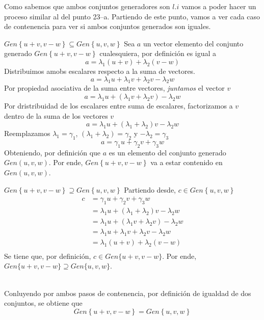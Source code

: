 \documentclass{article}
\begin{document}
\begin{enumerate}
                
        Como sabemos que ambos conjuntos generadores son \(l.i\) vamos a poder hacer un proceso similar al del punto 23--a.
        Partiendo de este punto, vamos a ver cada caso de contenencia para ver si ambos conjuntos generados son iguales.
        \ResetCases{}
        \begin{mathcase}{\(Gen\left\{u + v, v - w\right\} \subseteq Gen\left\{u, v, w\right\}\)}
            Sea \(a\) un vector elemento del conjunto generado \(Gen\left\{u + v, v - w\right\}\) cualesquiera, por definición es igual a
            \[
                a = \lambda_1\left(u + v\right) + \lambda_2\left(v - w\right)
            \]
            Distribuimos amobs escalares respecto a la suma de vectores.
            \[
                a = \lambda_1u + \lambda_1v + \lambda_2v - \lambda_2w
            \]
            Por propiedad asociativa de la suma entre vectores, \emph{juntamos} el vector \(v\)
            \[
                a = \lambda_1u + \left(\lambda_1v + \lambda_2v\right) - \lambda_2w
            \]
            Por dristribuidad de los escalares entre suma de escalares, factorizamos a \(v\) dentro de la suma de los vectores \(v\)
            \[
                a = \lambda_1u + \left(\lambda_1 + \lambda_2\right)v - \lambda_2w
            \]
            Reemplazamos \(\lambda_1 = \gamma_1\), \(\left(\lambda_1 + \lambda_2\right) = \gamma_2\) y \(-\lambda_2 = \gamma_3\)
            \[
                a = \gamma_1u + \gamma_2v + \gamma_3w
            \]
            Obteniendo, por definición que \(a\) es un elemento del conjunto generado \(Gen\left(u, v, w\right)\).
            Por ende, \(Gen\left\{u + v, v - w\right\}\) va a estar contenido en \(Gen\left(u, v, w\right)\).
        \end{mathcase}
        \begin{mathcase}{\(Gen\left\{u + v, v - w\right\} \supseteq Gen\left\{u, v, w\right\}\)}
            Partiendo desde, \(c \in Gen\left\{u, v, w\right\}\)
            \[
                \begin{aligned}
                    c &= \gamma_1u + \gamma_2v + \gamma_3w \\
                    &= \lambda_1u + \left(\lambda_1 + \lambda_2\right)v - \lambda_2w \\
                    &= \lambda_1u + \left(\lambda_1v + \lambda_2v\right) - \lambda_2w \\
                    &= \lambda_1u + \lambda_1v + \lambda_2v - \lambda_2w \\ 
                    &= \lambda_1\left(u + v\right) + \lambda_2\left(v - w\right) \\
                \end{aligned}
            \]
            Se tiene que, por definición, \(c \in Gen\{u + v, v - w\}\). 
            Por ende, \(Gen\{u + v, v - w\} \supseteq Gen\{u, v, w\}\).
        \end{mathcase}
        \\
        Conluyendo por ambos pasos de contenencia, por definición de igualdad de dos conjuntos, se obtiene que
        \[
            Gen\left\{u + v, v - w\right\} = Gen\left\{u, v, w\right\}
        \]


\end{enumerate}
\end{document}
